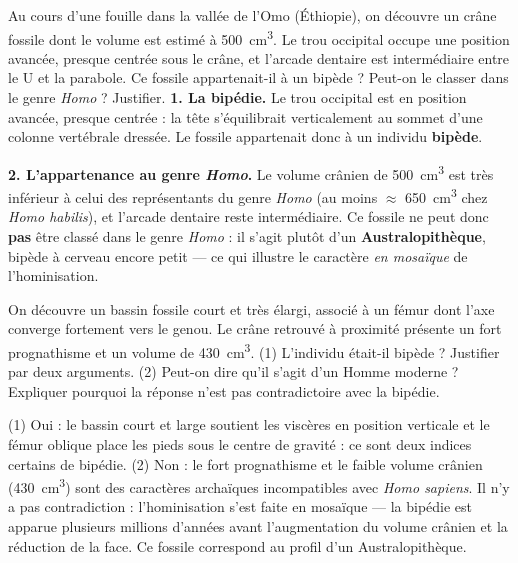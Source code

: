 \documentclass[11pt]{article}
\begin{document}
\begin{exoresolu}
Au cours d'une fouille dans la vallée de l'Omo (Éthiopie), on découvre un crâne fossile dont le volume est estimé à \SI{500}{cm^3}. Le trou occipital occupe une position avancée, presque centrée sous le crâne, et l'arcade dentaire est intermédiaire entre le U et la parabole. Ce fossile appartenait-il à un bipède ? Peut-on le classer dans le genre \emph{Homo} ? Justifier.
\tcblower
\textbf{1. La bipédie.} Le trou occipital est en position avancée, presque centrée : la tête s'équilibrait verticalement au sommet d'une colonne vertébrale dressée. Le fossile appartenait donc à un individu \textbf{bipède}.

\textbf{2. L'appartenance au genre \emph{Homo}.} Le volume crânien de \SI{500}{cm^3} est très inférieur à celui des représentants du genre \emph{Homo} (au moins $\approx$ \SI{650}{cm^3} chez \emph{Homo habilis}), et l'arcade dentaire reste intermédiaire. Ce fossile ne peut donc \textbf{pas} être classé dans le genre \emph{Homo} : il s'agit plutôt d'un \textbf{Australopithèque}, bipède à cerveau encore petit — ce qui illustre le caractère \emph{en mosaïque} de l'hominisation.
\end{exoresolu}

\begin{exercice}
On découvre un bassin fossile court et très élargi, associé à un fémur dont l'axe converge fortement vers le genou. Le crâne retrouvé à proximité présente un fort prognathisme et un volume de \SI{430}{cm^3}. (1) L'individu était-il bipède ? Justifier par deux arguments. (2) Peut-on dire qu'il s'agit d'un Homme moderne ? Expliquer pourquoi la réponse n'est pas contradictoire avec la bipédie.
\end{exercice}

\begin{corrige}[Exercice]
(1) Oui : le bassin court et large soutient les viscères en position verticale et le fémur oblique place les pieds sous le centre de gravité : ce sont deux indices certains de bipédie. (2) Non : le fort prognathisme et le faible volume crânien (\SI{430}{cm^3}) sont des caractères archaïques incompatibles avec \emph{Homo sapiens}. Il n'y a pas contradiction : l'hominisation s'est faite en mosaïque — la bipédie est apparue plusieurs millions d'années avant l'augmentation du volume crânien et la réduction de la face. Ce fossile correspond au profil d'un Australopithèque.
\end{corrige}
\end{document}
